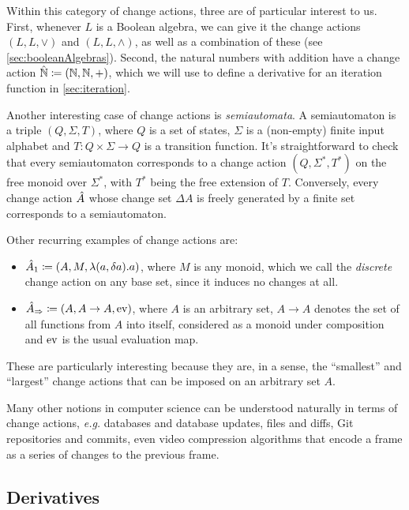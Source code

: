 Within this category of change actions, three are of particular interest to us. First, whenever
$L$ is a Boolean algebra, we can give it the change actions $(L, L, \vee)$ and $(L, L, \wedge)$, 
as well as a combination of these (see \cref{sec:booleanAlgebras}). Second,
the natural numbers with addition have a change action $\hat{\mathbb{N}} \coloneqq (\mathbb{N}, \mathbb{N}, +)$, which we will
use to define a derivative for an iteration function in \cref{sec:iteration}.

Another interesting case of change actions is \textit{semiautomata}. A semiautomaton is a triple
$(Q, \Sigma, T)$, where $Q$ is a set of states, $\Sigma$ is a (non-empty) finite input alphabet
and $T : Q \times \Sigma \rightarrow Q$ is a transition function. It's straightforward to check
that every semiautomaton corresponds to a change action $(Q, \Sigma^*, T^*)$ on the free monoid
over $\Sigma^*$, with $T^*$ being the free extension of $T$. Conversely, every change action $\hat{A}$
whose change set $\Delta A$ is freely generated by a finite set corresponds to a semiautomaton.

Other recurring examples of change actions are:
\begin{itemize}
  \item $\hat{A}_1 \coloneqq (A,M,\lambda(a, \delta a). a)$, where $M$ is any monoid,
    which we call the \emph{discrete} change action on any base set, since it
    induces no changes at all.
  \item $\hat{A}_\Rightarrow \coloneqq (A,A \rightarrow A,\operatorname{ev})$, where $A$ is an arbitrary
    set, $A \rightarrow A$ denotes the set of all functions from $A$ into itself, considered as
    a monoid under composition and $\operatorname{ev}$ is the usual evaluation map.
\end{itemize}
These are particularly interesting because they are, in a sense, the ``smallest'' and ``largest''
change actions that can be imposed on an arbitrary set $A$.

Many other notions in computer science can be understood naturally in terms of change actions,
\emph{e.g.} databases and database updates, files and diffs, Git repositories and commits, even 
video compression algorithms that encode a frame as a series of changes to the previous frame.

\subsection{Derivatives}

